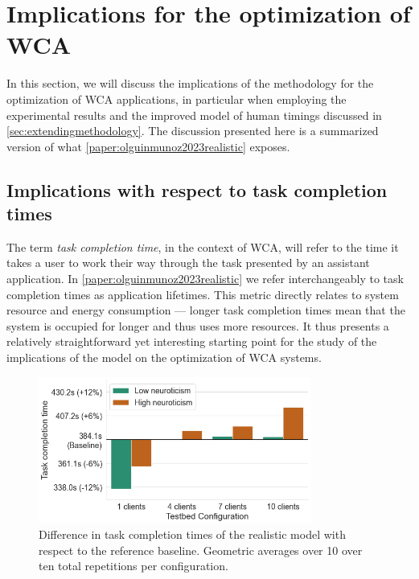 \section{Implications for the optimization of \acs{WCA}}

In this section, we will discuss the implications of the methodology for the optimization of \gls{WCA} applications, in particular when employing the experimental results and the improved model of human timings discussed in \cref{sec:extendingmethodology}.
The discussion presented here is a summarized version of what \cref{paper:olguinmunoz2023realistic} exposes.


\subsection{Implications with respect to task completion times}

The term \emph{task completion time}, in the context of \gls{WCA}, will refer to the time it takes a user to work their way through the task presented by an assistant application.
In \cref{paper:olguinmunoz2023realistic} we refer interchangeably to task completion times as application lifetimes.
This metric directly relates to system resource and energy consumption --- longer task completion times mean that the system is occupied for longer and thus uses more resources.
It thus presents a relatively straightforward yet interesting starting point for the study of the implications of the model on the optimization of \gls{WCA} systems.

\begin{figure}
    \centering
    \includegraphics[height=13em]{Figs/2023EdgeDroid2/task_durations_diff}
    \caption{Difference in task completion times of the realistic model with respect to the reference baseline.
    Geometric averages over \num{10} over ten total repetitions per configuration.}\label{fig:taskcompletiontimesdiff}
\end{figure}

